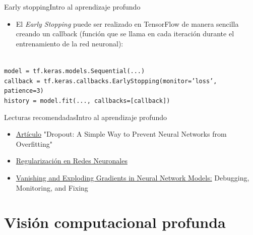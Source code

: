 \documentclass[10pt,border=3pt,tikz]{beamer}
\begin{document}
    \begin{frame}{Early stopping}{Intro al aprendizaje profundo}
        \begin{itemize}
            \item El \textit{Early Stopping} puede ser realizado en TensorFlow de manera sencilla creando un callback (función que se llama en cada iteración durante el entrenamiento de la red neuronal):\\
        \end{itemize}
        
        \texttt{\\model = tf.keras.models.Sequential(...)}\\
        \texttt{callback = tf.keras.callbacks.EarlyStopping(monitor='loss', patience=3)}\\
        \texttt{history = model.fit(..., callbacks=[callback])}
    \end{frame}
    
    \begin{frame}{Lecturas recomendadas}{Intro al aprendizaje profundo}
        \begin{itemize}
            \item \colorbox{blue!10}{\href{https://jmlr.org/papers/v15/srivastava14a.html}{Artículo}} "Dropout: A Simple Way to Prevent Neural Networks from Overfitting"
            \item \colorbox{blue!10}{\href{https://www.pinecone.io/learn/regularization-in-neural-networks/}{Regularización en Redes Neuronales}}
            \item \colorbox{blue!10}{\href{https://neptune.ai/blog/vanishing-and-exploding-gradients-debugging-monitoring-fixing}{Vanishing and Exploding Gradients in Neural Network Models:}} Debugging, Monitoring, and Fixing
        \end{itemize}
    \end{frame}
    
    
    \section{Visión computacional profunda}
    
    
    \begin{frame}
        \sectionpage
    \end{frame}
    
\end{document}
